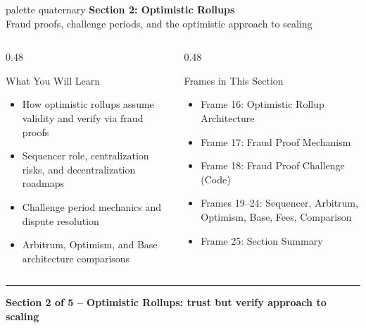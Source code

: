 \documentclass[8pt,aspectratio=169]{beamer}
\newcommand{\bottomnote}[1]{\vfill\vspace{-2mm}\textcolor{mllavender2}{\rule{\textwidth}{0.4pt}}\vspace{1mm}\footnotesize\textbf{#1}}
\begin{document}
\begin{frame}{}
\begin{beamercolorbox}[sep=12pt,center,rounded=true,shadow=true]{palette quaternary}
{\Large\bfseries Section 2: Optimistic Rollups}\\[6pt]
{\normalsize Fraud proofs, challenge periods, and the optimistic approach to scaling}
\end{beamercolorbox}
\vspace{6mm}
\begin{columns}[T]
\begin{column}{0.48\textwidth}
\begin{block}{What You Will Learn}
\begin{itemize}\setlength\itemsep{3pt}
  \item[\small$\checkmark$] \small How optimistic rollups assume validity and verify via fraud proofs
  \item[\small$\checkmark$] \small Sequencer role, centralization risks, and decentralization roadmaps
  \item[\small$\checkmark$] \small Challenge period mechanics and dispute resolution
  \item[\small$\checkmark$] \small Arbitrum, Optimism, and Base architecture comparisons
\end{itemize}
\end{block}
\end{column}
\begin{column}{0.48\textwidth}
\begin{block}{Frames in This Section}
\begin{itemize}\setlength\itemsep{3pt}
  \item[\small$\bullet$] \small Frame 16: Optimistic Rollup Architecture
  \item[\small$\bullet$] \small Frame 17: Fraud Proof Mechanism
  \item[\small$\bullet$] \small Frame 18: Fraud Proof Challenge (Code)
  \item[\small$\bullet$] \small Frames 19--24: Sequencer, Arbitrum, Optimism, Base, Fees, Comparison
  \item[\small$\bullet$] \small Frame 25: Section Summary
\end{itemize}
\end{block}
\end{column}
\end{columns}
\bottomnote{Section 2 of 5 -- Optimistic Rollups: trust but verify approach to scaling}
\end{frame}
\end{document}
